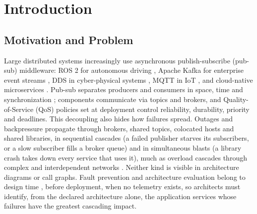 \section{Introduction}
\label{sec:1}

\subsection{Motivation and Problem}
\label{sec:1.1}

Large distributed systems increasingly use asynchronous publish-subscribe (pub-sub) middleware: ROS 2 for autonomous driving \cite{macenski2022robot}, Apache Kafka for enterprise event streams \cite{kreps2011kafka}, DDS in cyber-physical systems \cite{omg2015dds}, MQTT in IoT \cite{oasis2019mqtt}, and cloud-native microservices \cite{dragoni2017microservices,newman2015building}. Pub-sub separates producers and consumers in space, time and synchronization \cite{eugster2003faces}; components communicate via topics and brokers, and Quality-of-Service (QoS) policies set at deployment control reliability, durability, priority and deadlines. This decoupling also hides how failures spread. Outages and backpressure propagate through brokers, shared topics, colocated hosts and shared libraries, in sequential cascades (a failed publisher starves its subscribers, or a slow subscriber fills a broker queue) and in simultaneous blasts (a library crash takes down every service that uses it), much as overload cascades through complex and interdependent networks \cite{motter2002cascade,buldyrev2010cascade}. Neither kind is visible in architecture diagrams or call graphs. Fault prevention and architecture evaluation belong to design time \cite{avizienis2004basic,bass2012software}, before deployment, when no telemetry exists, so architects must identify, from the declared architecture alone, the application services whose failures have the greatest cascading impact.

